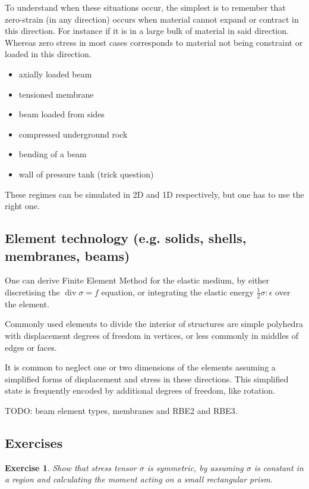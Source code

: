\documentclass{article}
\DeclareMathOperator{\dive}{div}
\newtheorem{exercise}{Exercise}[section]
\begin{document}
To understand when these situations occur, the simplest is to remember that zero-strain (in any direction) occurs when material cannot expand or contract in this direction. For instance if it is in a large bulk of material in said direction. Whereas zero stress in most cases corresponds to material not being constraint or loaded in this direction.
\begin{itemize}
    \item axially loaded beam
    \item tensioned membrane
    \item beam loaded from sides
    \item compressed underground rock
    \item bending of a beam
    \item wall of pressure tank (trick question)
\end{itemize}

These regimes can be simulated in 2D and 1D respectively, but one has to use the right one.

\subsection{Element technology (e.g. solids, shells, membranes, beams)}

One can derive Finite Element Method for the elastic medium, by either discretising the $\dive\sigma=f$ equation, or integrating the elastic energy $\frac{1}{2}\sigma:\epsilon$ over the element.

Commonly used elements to divide the interior of structures are simple polyhedra with displacement degrees of freedom in vertices, or less commonly in middles of edges or faces.

It is common to neglect one or two dimensions of the elements assuming a simplified forms of displacement and stress in these directions. This simplified state is frequently encoded by additional degrees of freedom, like rotation.

TODO: beam element types, membranes and RBE2 and RBE3.

\subsection*{Exercises}
\begin{exercise}
    Show that stress tensor $\sigma$ is symmetric, by assuming $\sigma$ is constant in a region and calculating the moment acting on a small rectangular prism.
\end{exercise}
\end{document}
